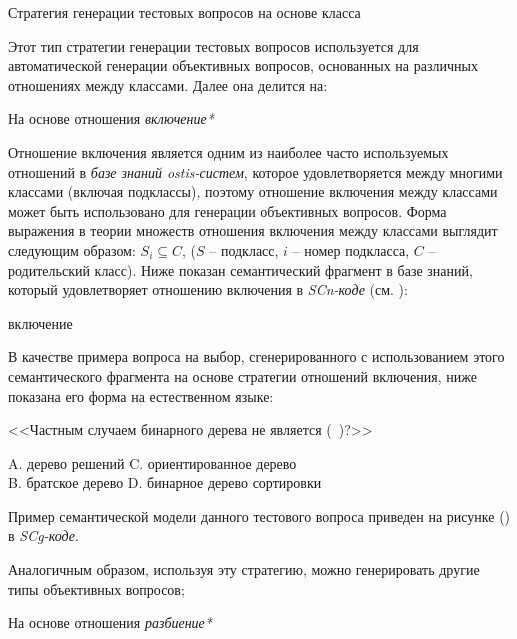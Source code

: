 \begin{textitemize}
	\item Стратегия генерации тестовых вопросов на основе класса
	
	Этот тип стратегии генерации тестовых вопросов используется для автоматической генерации объективных вопросов, основанных на различных отношениях между классами. Далее она делится на:
	
	\begin{textitemize}
		\item На основе отношения \textit{включение*}
		
		Отношение включения является одним из наиболее часто используемых отношений в \textit{базе знаний ostis-систем}, которое удовлетворяется между многими классами (включая подклассы), поэтому отношение включения между классами может быть использовано для генерации объективных вопросов. Форма выражения в теории множеств отношения включения между классами выглядит следующим образом: $S_{i}\subseteq  C $, ($S$ – подкласс, $i$ – номер подкласса, $C$ – родительский класс). Ниже показан семантический фрагмент в базе знаний, который удовлетворяет отношению включения в \textit{SCn-коде} (см. ): 
		\begin{SCn}
			\begin{scnrelfromlist}{включение} 
			\end{scnrelfromlist}
		\end{SCn}
		В качестве примера вопроса на выбор, сгенерированного с использованием этого семантического фрагмента на основе стратегии отношений включения, ниже показана его форма на естественном языке:
		
		<<Частным случаем бинарного дерева не является (\ )?>>
		
		A. дерево решений   \quad C. ориентированное дерево \\
		B. братское дерево  \quad D. бинарное дерево сортировки
		
		Пример семантической модели данного тестового вопроса приведен на рисунке (\textit{}) в \textit{SCg-коде}.
		
		Аналогичным образом, используя эту стратегию, можно генерировать другие типы объективных вопросов;
		
		\item На основе отношения \textit{разбиение*}
		

\end{textitemize}
\end{textitemize}
